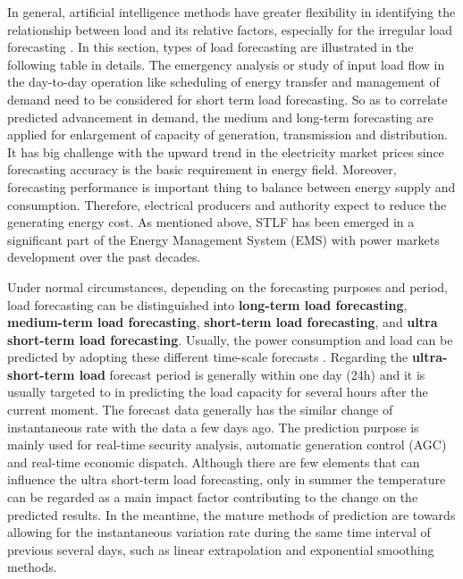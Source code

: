\par In general, artificial intelligence methods have greater flexibility in identifying the relationship between load and its relative factors, especially for the irregular load forecasting \cite{espinoza2007electric}. In this section, types of load forecasting are illustrated in the following table in details. The emergency analysis or study of input load flow in the day-to-day operation like scheduling of energy transfer and management of demand need to be considered for short term load forecasting. So as to correlate predicted advancement in demand, the medium and long-term forecasting are applied for enlargement of capacity of generation, transmission and distribution. It has big challenge with the upward trend in the electricity market prices since forecasting accuracy is the basic requirement in energy field. Moreover, forecasting performance is important thing to balance between energy supply and consumption. Therefore, electrical producers and authority expect to reduce the generating energy cost. As mentioned above, STLF has been emerged in a significant part of the Energy Management System (EMS) with power markets development over the past decades.
\par Under normal circumstances, depending on the forecasting purposes and period, load forecasting can be distinguished into  \textbf{long-term load forecasting}, \textbf{medium-term load forecasting}, \textbf{short-term load forecasting}, and \textbf{ultra short-term load forecasting}. Usually, the power consumption and load can be predicted by adopting these different time-scale forecasts \cite{alfares2002electric}. 
Regarding the \textbf{ultra-short-term load} forecast period is generally within one day (24h) and it is usually targeted to   in predicting the load capacity for several hours after the current moment. The forecast data generally has the similar change of instantaneous rate with the data a few days ago. The prediction purpose is mainly used for real-time security analysis, automatic generation control (AGC) and real-time economic dispatch. Although there are few elements that can influence the ultra short-term load forecasting, only in summer the temperature can be regarded as a main impact factor contributing to the change on the predicted results. In the meantime, the mature methods of prediction are towards allowing for the instantaneous variation rate during the same time interval of previous several days, such as linear extrapolation and exponential smoothing methods.

